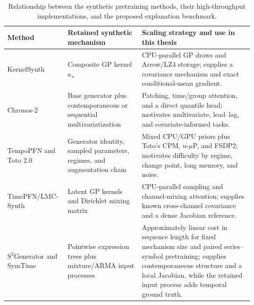 \begin{table}[H]
\centering
\footnotesize
\renewcommand{\arraystretch}{1.04}
\begin{tabular}{@{}p{}p{}p{}@{}}
\toprule
Method & Retained synthetic mechanism & Scaling strategy and use in this thesis \\
\midrule
KernelSynth & Composite GP kernel $\kappa_\star$ & CPU-parallel GP draws and Arrow/LZ4 storage; supplies a covariance mechanism and exact conditional-mean gradient. \\
Chronos-2 & Base generator plus contemporaneous or sequential multivariatization & Patching, time/group attention, and a direct quantile head; motivates multivariate, lead--lag, and covariate-informed tasks. \\
TempoPFN and Toto 2.0 & Generator identity, sampled parameters, regimes, and augmentation chain & Mixed CPU/GPU priors plus Toto's CPM, u-$\mu$P, and FSDP2; motivates difficulty by regime, change point, long memory, and noise. \\
TimePFN/LMC-Synth & Latent GP kernels and Dirichlet mixing matrix & CPU-parallel sampling and channel-mixing attention; supplies known cross-channel covariance and a dense Jacobian reference. \\
S$^2$Generator and SymTime & Pointwise expression trees plus mixture/ARMA input processes & Approximately linear cost in sequence length for fixed mechanism size and paired series--symbol pretraining; supplies contemporaneous structure and a local Jacobian, while the retained input process adds temporal ground truth. \\
\bottomrule
\end{tabular}
\caption{Relationship between the synthetic pretraining methods, their
high-throughput implementations, and the proposed explanation benchmark.}
\label{tab:foundation-synthetic-comparison}
\end{table}


